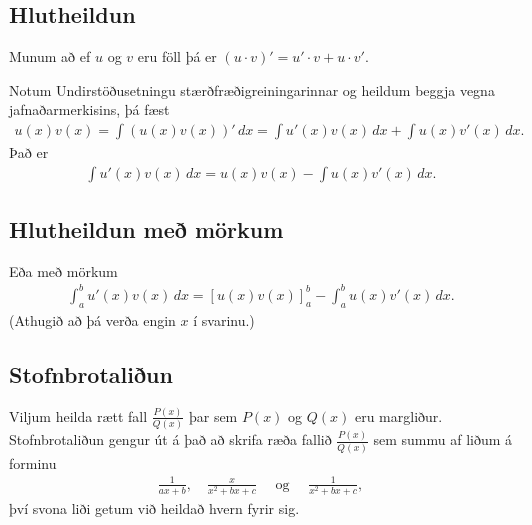 \documentclass[a4paper,10pt,icelandic]{sphinxmanual}
\begin{document}
\subsection{Hlutheildun}
\label{kafli06:hlutheildun}\label{kafli06:index-11}
Munum að ef \(u\) og \(v\) eru föll þá er
\((u\cdot v)' = u'\cdot v + u \cdot v'\).

Notum Undirstöðusetningu stærðfræðigreiningarinnar og heildum beggja
vegna jafnaðarmerkisins, þá fæst
\begin{equation*}
\begin{split}u(x)v(x) = \int (u(x)v(x))'\, dx = \int u'(x)v(x)\, dx + \int u(x)v'(x)\, dx.\end{split}
\end{equation*}
Það er
\begin{equation*}
\begin{split}\int u'(x)v(x)\, dx = u(x)v(x) -  \int u(x)v'(x)\, dx.\end{split}
\end{equation*}

\subsection{Hlutheildun með mörkum}
\label{kafli06:hlutheildun-me-morkum}
Eða með mörkum
\begin{equation*}
\begin{split}\int_a^b u'(x)v(x)\, dx = [u(x)v(x)]_a^b -  \int_a^b u(x)v'(x)\, dx.\end{split}
\end{equation*}
(Athugið að þá verða engin \(x\) í svarinu.)


\subsection{Stofnbrotaliðun}
\label{kafli06:stofnbrotaliun}\label{kafli06:index-12}
Viljum heilda rætt fall \(\frac{P(x)}{Q(x)}\) þar sem \(P(x)\)
og \(Q(x)\) eru margliður. Stofnbrotaliðun gengur út á það að skrifa ræða fallið
\(\frac{P(x)}{Q(x)}\) sem summu af liðum á forminu
\begin{equation*}
\begin{split}\frac{1}{ax+b}, \quad \frac{x}{x^2+bx+c} \quad\text{ og }\quad \frac{1}{x^2+bx+c},\end{split}
\end{equation*}
því svona liði getum við heildað hvern fyrir sig.
\end{document}
